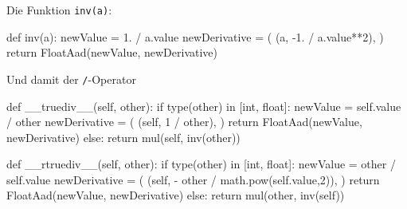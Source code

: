 \documentclass[
  a4paper,
  DIV=11]{scrreprt}
\newenvironment{Shaded}{\begin{snugshade}}{\end{snugshade}}
\newcommand{\BuiltInTok}[1]{\textcolor[rgb]{0.00,0.23,0.31}{#1}}
\newcommand{\ControlFlowTok}[1]{\textcolor[rgb]{0.00,0.23,0.31}{#1}}
\newcommand{\DecValTok}[1]{\textcolor[rgb]{0.68,0.00,0.00}{#1}}
\newcommand{\FloatTok}[1]{\textcolor[rgb]{0.68,0.00,0.00}{#1}}
\newcommand{\FunctionTok}[1]{\textcolor[rgb]{0.28,0.35,0.67}{#1}}
\newcommand{\KeywordTok}[1]{\textcolor[rgb]{0.00,0.23,0.31}{#1}}
\newcommand{\NormalTok}[1]{\textcolor[rgb]{0.00,0.23,0.31}{#1}}
\newcommand{\OperatorTok}[1]{\textcolor[rgb]{0.37,0.37,0.37}{#1}}
\newcommand{\VariableTok}[1]{\textcolor[rgb]{0.07,0.07,0.07}{#1}}
\theoremstyle{definition}
\theoremstyle{definition}
\theoremstyle{remark}
\begin{document}
\begin{tcolorbox}[enhanced jigsaw, titlerule=0mm, title=\textcolor{quarto-callout-tip-color}{\faLightbulb}\hspace{0.5em}{Lösung}, breakable, coltitle=black, leftrule=.75mm, bottomrule=.15mm, colback=white, rightrule=.15mm, opacitybacktitle=0.6, bottomtitle=1mm, toptitle=1mm, left=2mm, toprule=.15mm, colbacktitle=quarto-callout-tip-color!10!white, colframe=quarto-callout-tip-color-frame, arc=.35mm, opacityback=0]

Die Funktion \texttt{inv(a)}:

\begin{Shaded}
\begin{Highlighting}[]
\KeywordTok{def}\NormalTok{ inv(a):}
\NormalTok{    newValue }\OperatorTok{=} \FloatTok{1.} \OperatorTok{/}\NormalTok{ a.value}
\NormalTok{    newDerivative }\OperatorTok{=}\NormalTok{ (}
\NormalTok{        (a, }\OperatorTok{{-}}\FloatTok{1.} \OperatorTok{/}\NormalTok{ a.value}\OperatorTok{**}\DecValTok{2}\NormalTok{), }
\NormalTok{    )}
    \ControlFlowTok{return}\NormalTok{ FloatAad(newValue, newDerivative)}
\end{Highlighting}
\end{Shaded}

Und damit der \texttt{/}-Operator

\begin{Shaded}
\begin{Highlighting}[]
\KeywordTok{def} \FunctionTok{\_\_truediv\_\_}\NormalTok{(}\VariableTok{self}\NormalTok{, other):}
    \ControlFlowTok{if} \BuiltInTok{type}\NormalTok{(other) }\KeywordTok{in}\NormalTok{ [}\BuiltInTok{int}\NormalTok{, }\BuiltInTok{float}\NormalTok{]:}
\NormalTok{        newValue }\OperatorTok{=} \VariableTok{self}\NormalTok{.value }\OperatorTok{/}\NormalTok{ other}
\NormalTok{        newDerivative }\OperatorTok{=}\NormalTok{ (}
\NormalTok{            (}\VariableTok{self}\NormalTok{, }\DecValTok{1} \OperatorTok{/}\NormalTok{ other),}
\NormalTok{        )}
        \ControlFlowTok{return}\NormalTok{ FloatAad(newValue, newDerivative)}
    \ControlFlowTok{else}\NormalTok{:}
        \ControlFlowTok{return}\NormalTok{ mul(}\VariableTok{self}\NormalTok{, inv(other))}
        
\KeywordTok{def} \FunctionTok{\_\_rtruediv\_\_}\NormalTok{(}\VariableTok{self}\NormalTok{, other):}
    \ControlFlowTok{if} \BuiltInTok{type}\NormalTok{(other) }\KeywordTok{in}\NormalTok{ [}\BuiltInTok{int}\NormalTok{, }\BuiltInTok{float}\NormalTok{]:}
\NormalTok{        newValue }\OperatorTok{=}\NormalTok{ other }\OperatorTok{/} \VariableTok{self}\NormalTok{.value}
\NormalTok{        newDerivative }\OperatorTok{=}\NormalTok{ (}
\NormalTok{            (}\VariableTok{self}\NormalTok{, }\OperatorTok{{-}}\NormalTok{ other }\OperatorTok{/}\NormalTok{ math.}\BuiltInTok{pow}\NormalTok{(}\VariableTok{self}\NormalTok{.value,}\DecValTok{2}\NormalTok{)),}
\NormalTok{        )}
        \ControlFlowTok{return}\NormalTok{ FloatAad(newValue, newDerivative)}
    \ControlFlowTok{else}\NormalTok{:}
        \ControlFlowTok{return}\NormalTok{ mul(other, inv(}\VariableTok{self}\NormalTok{))}
\end{Highlighting}
\end{Shaded}


\end{tcolorbox}
\end{document}
